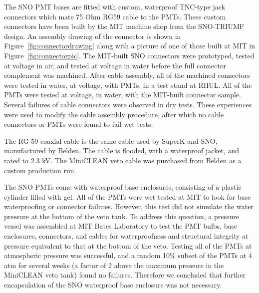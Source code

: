 \documentclass[preprint,12pt]{elsarticle}
\begin{document}
The SNO PMT bases are fitted with custom, waterproof TNC-type jack
connectors which mate 75 Ohm RG59 cable to the PMTs.  These custom
connectors have been built by the MIT machine shop from the SNO-TRIUMF
design. An assembly drawing of the connector is shown in
Figure~\ref{fig:connectordrawing} along with a picture of one of those
built at MIT in Figure~\ref{fig:connectorpic}. The MIT-built SNO
connectors were prototyped, tested at voltage in air, and tested at
voltage in water before the full connector complement was machined.
After cable assembly, all of the machined connectors were tested in
water, at voltage, with PMTs, in a test stand at RHUL.  All of the
PMTs were tested at voltage, in water, with the MIT-built connector
sample.  Several failures of cable connectors were observed in dry
tests.  These experiences were used to modify the cable assembly
procedure, after which no cable connectors or PMTs were found to fail
wet tests.

The RG-59 coaxial cable is the same cable used by SuperK and SNO,
manufactured by Belden.  The cable is flooded, with a waterproof
jacket, and rated to 2.3 kV.  The MiniCLEAN veto cable was purchased
from Belden as a custom production run.  

The SNO PMTs come with waterproof base enclosures, consisting of a
plastic cylinder filled with gel.  All of the PMTs were wet tested at
MIT to look for base waterproofing or connector failures.  However,
this test did not simulate the water pressure at the bottom of the
veto tank.  To address this question, a pressure vessel was assembled
at MIT Bates Laboratory to test the PMT bulbs, base enclosures, connectors, and
cables for waterproofness and structural integrity at pressure
equivalent to that at the bottom of the veto. Testing
all of the PMTs at atmospheric pressure was successful, and a random
10\% subset of the PMTs at 4 atm for several weeks (a factor of 2
above the maximum pressure in the MiniCLEAN veto tank) found no
failures.  Therefore we concluded that further encapsulation of the
SNO waterproof base enclosure was not necessary.
\end{document}
